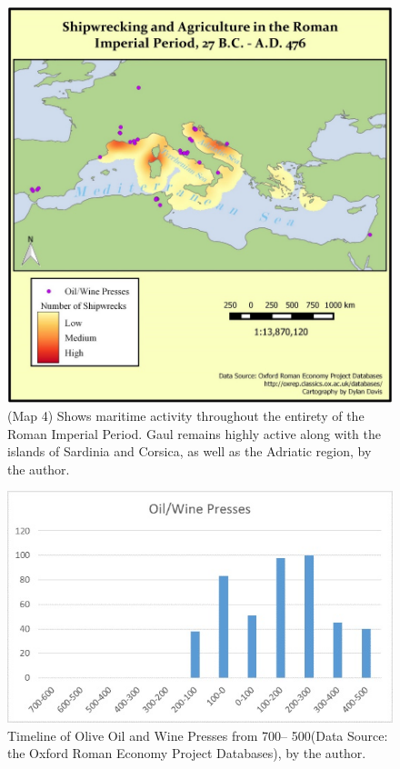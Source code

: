 	
	\begin{figure}[!p]
		\includegraphics[width=\linewidth]{figures/Davis_Agroeconomy_Map4.jpg}
		\centering
		\caption{(Map 4) Shows maritime activity throughout the entirety of the Roman Imperial Period. Gaul remains highly active along with the islands of Sardinia and Corsica, as well as the Adriatic region, by the author.}
		\label{fig:DavisMap4}
	\end{figure}
	
	
	
	\begin{figure}[!p]
		\includegraphics[width=\linewidth]{figures/Davis_Agroeconomy_Fig3.jpg}
		\centering
		\caption{Timeline of Olive Oil and Wine Presses from 700\BC –  500\AD (Data Source: the Oxford Roman Economy Project Databases), by the author.}
		\label{fig:DavisFig3}
	\end{figure}
	
